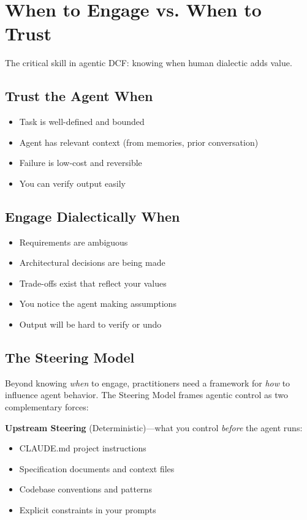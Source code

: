 \chapter{When to Engage vs. When to Trust}

The critical skill in agentic DCF: knowing when human dialectic adds value.

\section{Trust the Agent When}

\begin{itemize}
    \item Task is well-defined and bounded
    \item Agent has relevant context (from memories, prior conversation)
    \item Failure is low-cost and reversible
    \item You can verify output easily
\end{itemize}

\section{Engage Dialectically When}

\begin{itemize}
    \item Requirements are ambiguous
    \item Architectural decisions are being made
    \item Trade-offs exist that reflect your values
    \item You notice the agent making assumptions
    \item Output will be hard to verify or undo
\end{itemize}

\section{The Steering Model}\label{sec:steering-model}

Beyond knowing \emph{when} to engage, practitioners need a framework for \emph{how} to influence agent behavior. The Steering Model frames agentic control as two complementary forces:

\textbf{Upstream Steering} (Deterministic)---what you control \emph{before} the agent runs:
\begin{itemize}
    \item CLAUDE.md project instructions
    \item Specification documents and context files
    \item Codebase conventions and patterns
    \item Explicit constraints in your prompts
\end{itemize}

